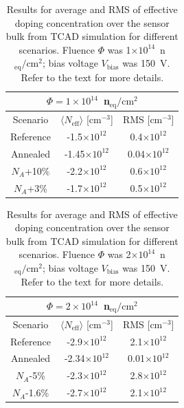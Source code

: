 \begin{table}[htbp]
   \caption{\label{tab:TCADNeffHamburg1}Results for average and RMS of effective doping concentration over the sensor bulk from TCAD simulation for different scenarios. 
Fluence $\Phi$ was 1$\times10^{14}$~n$_\text{eq}/\text{cm}^{2}$; bias voltage $V_\text{bias}$ 
was 150~V.  Refer to the text for more details.}
   \centering
   \begin{tabular}{ccc} 
      \hline
            \multicolumn{3}{c}{$\Phi=1\times10^{14}$~n$_\text{eq}/\text{cm}^{2}$  } \\
      \hline 
        Scenario  & $\langle N_\text{eff}\rangle$ [cm$^{-3}$] & RMS [cm$^{-3}$] \\
      \hline
      \hline
       Reference &  -1.5$\times10^{12}$ & 0.4$\times10^{12}$  \\
 Annealed   & -1.45$\times10^{12}$ & 0.04$\times10^{12}$ \\
 $N_A$+10\% &  -2.2$\times10^{12}$ & 0.6$\times10^{12}$  \\
 $N_A$+3\% &  -1.7$\times10^{12}$ & 0.5$\times10^{12}$  \\
      \hline
         \end{tabular}
\end{table}




\begin{table}[!htbp]
   \caption{\label{tab:TCADNeffHamburg2}Results for average and RMS of effective doping concentration over the sensor bulk from TCAD simulation for different scenarios. 
Fluence $\Phi$ was 2$\times10^{14}$~n$_\text{eq}/\text{cm}^{2}$; bias voltage $V_\text{bias}$ 
was 150~V.  Refer to the text for more details.}
   \centering
   \begin{tabular}{ccc} %
      \hline
            \multicolumn{3}{c}{$\Phi=2\times10^{14}$~n$_\text{eq}/\text{cm}^{2}$  } \\
      \hline %
        Scenario  & $\langle N_\text{eff}\rangle$ [cm$^{-3}$] & RMS [cm$^{-3}$] \\
      \hline
      \hline
         Reference &  -2.9$\times10^{12}$ & 2.1$\times10^{12}$  \\
 Annealed   & -2.34$\times10^{12}$ & 0.01$\times10^{12}$ \\
 $N_A$-5\% &  -2.3$\times10^{12}$ & 2.8$\times10^{12}$  \\
 $N_A$-1.6\% &  -2.7$\times10^{12}$ & 2.1$\times10^{12}$  \\
                   \bottomrule
   \end{tabular}
\end{table}

